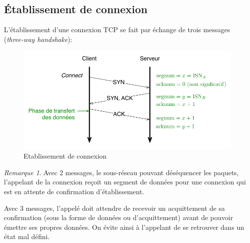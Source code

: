 \documentclass[11pt,english,french]{scrreprt}
\theoremstyle{remark}
\newtheorem*{rem*}{Remarque}
\theoremstyle{definition}
\begin{document}
\subsection{Établissement de connexion} %

L'établissement d'une connexion TCP se fait par échange de trois messages (\emph{three-way handshake}):
\begin{figure}[h!]
	\center
	\includegraphics[scale=.75]{graphes/TCP/Etablissement}
	\caption{Etablissement de connexion}
\end{figure}
\begin{rem*}
	Avec 2 messages, le sous-réseau pouvant déséquencer les paquets, l'appelant de la connexion reçoit un segment de données pour une connexion qui est en attente de confirmation d'établissement.

Avec 3 messages, l'appelé doit attendre de recevoir un acquittement de sa confirmation (sous la forme de données ou d'acquittement) avant de pouvoir émettre ses propres données. On évite ainsi à l'appelant de se retrouver dans un état mal défini.
\end{rem*}
\end{document}
